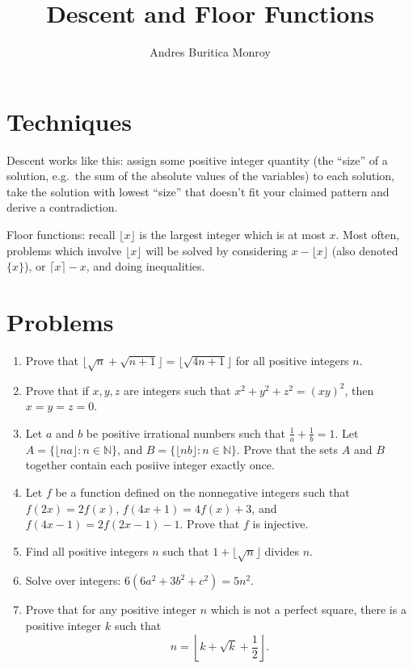 \documentclass{article}
\title{Descent and Floor Functions}
\author{Andres Buritica Monroy}
\date{}
\begin{document}
\maketitle
\section{Techniques}
  Descent works like this: assign some positive integer quantity
  (the ``size'' of a solution, e.g.\ the sum of the absolute values of the
  variables) to each solution, take the solution with lowest
  ``size'' that doesn't fit your claimed pattern and derive a contradiction.

  Floor functions: recall $\lfloor x\rfloor$ is the largest integer which is at
  most $x$. Most often, problems which involve $\lfloor x\rfloor$ will be
  solved by considering $x-\lfloor x\rfloor$ (also denoted $\{x\}$), or $\lceil
  x\rceil-x$, and doing inequalities.
\section{Problems}
\begin{enumerate}
  \item Prove that $\lfloor\sqrt n+\sqrt{n+1}\rfloor=\lfloor\sqrt{4n+1}\rfloor$ for all
      positive integers $n$.
  \item Prove that if $x, y, z$ are integers such that $x^2+y^2+z^2=(xy)^2$,
      then $x=y=z=0$.
  \item Let $a$ and $b$ be positive irrational numbers such that $\frac 1a+\frac 1b=1$.
    Let $A=\{\lfloor na\rfloor: n\in\mathbb N\}$, and $B=\{\lfloor nb\rfloor:
    n\in\mathbb N\}$. Prove that the sets $A$ and $B$ together contain each
    posiive integer exactly once.
  \item Let $f$ be a function defined on the nonnegative integers such that
    $f(2x)=2f(x)$, $f(4x+1)=4f(x)+3$, and $f(4x-1)=2f(2x-1)-1$. Prove that $f$
    is injective.
  \item Find all positive integers $n$ such that $1+\lfloor\sqrt n\rfloor$
    divides $n$.
  \item Solve over integers: $6(6a^2 + 3b^2 + c^2) = 5n^2$.
  \item Prove that for any positive integer $n$ which is not a perfect square,
    there is a positive integer $k$ such that
    \[n=\left\lfloor k+\sqrt k+\frac12\right\rfloor.\]
\end{enumerate}
\newpage
\end{document}
